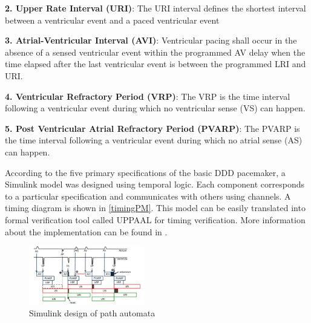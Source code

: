 \textbf{2. Upper Rate Interval (URI)}:
The URI interval defines the shortest interval between a ventricular event and a paced ventricular event

\textbf{3. Atrial-Ventricular Interval (AVI)}:
Ventricular pacing shall occur in the absence of a sensed ventricular event within the programmed AV delay when the time elapsed after the last ventricular event is between the programmed LRI and URI.

\textbf{4. Ventricular Refractory Period (VRP)}:
The VRP is the time interval following a ventricular event during which no ventricular sense (VS) can happen.

\textbf{5. Post Ventricular Atrial Refractory Period (PVARP)}:
The PVARP is the time interval following a ventricular event during which no atrial sense (AS) can happen.

According to the five primary specifications of the basic DDD pacemaker, a Simulink model was designed using temporal logic. Each component corresponds to a particular specification and communicates with others using channels. A timing diagram is shown in \ref{timingPM}. This model can be easily translated into formal verification tool called UPPAAL for timing verification. More information about the implementation can be found in \cite{STTT13}. 

\begin{figure}[!b]
	\center
	\vspace{-10pt}
	\includegraphics[width=0.45\textwidth]{figures/PM_timers.pdf}
	\vspace{-10pt}
	\caption{Simulink design of path automata}
	\label{fig:timingPM}
\end{figure}
